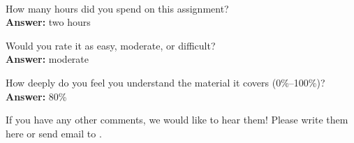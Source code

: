 \documentclass[11pt]{article}
\begin{document}
\begin{debriefing} \hfill\\[-4ex]
\begin{enumerate*}
\item How many hours did you spend on this assignment?\\
\noindent \textbf{Answer:} two hours
\item Would you rate it as easy, moderate, or difficult?\\
\noindent \textbf{Answer:} moderate
\item How deeply do you feel you understand the material it covers (0\%–100\%)?\\
\noindent \textbf{Answer:} 80\%
\item If you have any other comments, we would like to hear them!
  Please write them here or send email to
  .
\end{enumerate*}
\end{debriefing}
\end{document}
